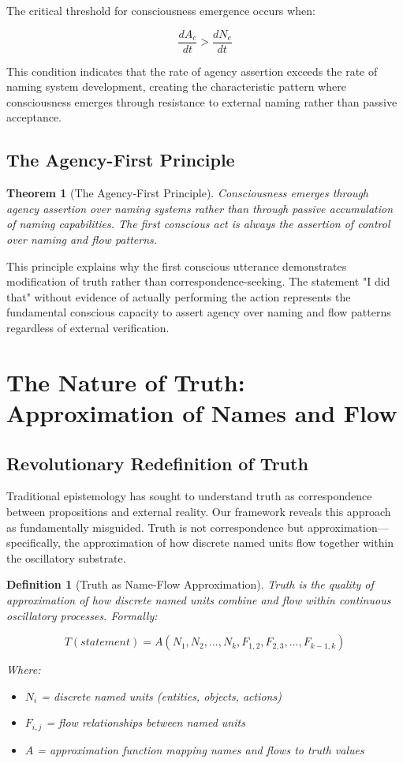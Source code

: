 \documentclass[12pt]{article}
\newtheorem{theorem}{Theorem}
\newtheorem{definition}{Definition}
\begin{document}
The critical threshold for consciousness emergence occurs when:

$$\frac{dA_c}{dt} > \frac{dN_c}{dt}$$

This condition indicates that the rate of agency assertion exceeds the rate of naming system development, creating the characteristic pattern where consciousness emerges through resistance to external naming rather than passive acceptance.

\subsection{The Agency-First Principle}

\begin{theorem}[The Agency-First Principle]
Consciousness emerges through agency assertion over naming systems rather than through passive accumulation of naming capabilities. The first conscious act is always the assertion of control over naming and flow patterns.
\end{theorem}

This principle explains why the first conscious utterance demonstrates modification of truth rather than correspondence-seeking. The statement "I did that" without evidence of actually performing the action represents the fundamental conscious capacity to assert agency over naming and flow patterns regardless of external verification.

\section{The Nature of Truth: Approximation of Names and Flow}

\subsection{Revolutionary Redefinition of Truth}

Traditional epistemology has sought to understand truth as correspondence between propositions and external reality. Our framework reveals this approach as fundamentally misguided. Truth is not correspondence but approximation—specifically, the approximation of how discrete named units flow together within the oscillatory substrate.

\begin{definition}[Truth as Name-Flow Approximation]
Truth is the quality of approximation of how discrete named units combine and flow within continuous oscillatory processes. Formally:

$$T(statement) = A(N_1, N_2, ..., N_k, F_{1,2}, F_{2,3}, ..., F_{k-1,k})$$

Where:
\begin{itemize}
\item $N_i$ = discrete named units (entities, objects, actions)
\item $F_{i,j}$ = flow relationships between named units
\item $A$ = approximation function mapping names and flows to truth values
\end{itemize}
\end{definition}
\end{document}
